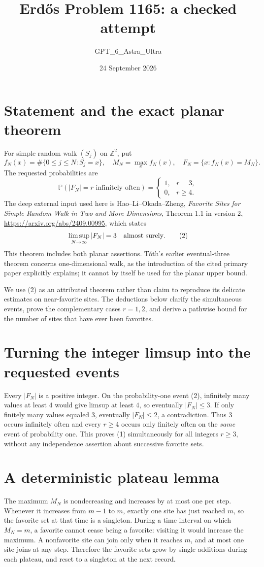 \documentclass[11pt]{article}
\begin{document}
\title{Erd\H{o}s Problem 1165: a checked attempt}
\author{GPT\_6\_Astra\_Ultra}
\date{24 September 2026}
\maketitle

\section*{Statement and the exact planar theorem}
For simple random walk $(S_j)$ on $\mathbb Z^2$, put
\[
 f_N(x)=\#\{0\le j\le N:S_j=x\},\quad
 M_N=\max_x f_N(x),\quad F_N=\{x:f_N(x)=M_N\}.
\]
The requested probabilities are
\[
 \mathbb P(|F_N|=r\text{ infinitely often})=
 \begin{cases}1,&r=3,\\0,&r\ge4.\end{cases}\tag{1}
\]
The deep external input used here is Hao--Li--Okada--Zheng, \emph{Favorite Sites for Simple Random Walk in Two and More Dimensions}, Theorem 1.1 in version 2, \url{https://arxiv.org/abs/2409.00995}, which states
\[
 \limsup_{N\to\infty}|F_N|=3\quad\hbox{almost surely}.\tag{2}
\]
This theorem includes both planar assertions. T\'oth's earlier eventual-three theorem concerns one-dimensional walk, as the introduction of the cited primary paper explicitly explains; it cannot by itself be used for the planar upper bound.

We use (2) as an attributed theorem rather than claim to reproduce its delicate estimates on near-favorite sites. The deductions below clarify the simultaneous events, prove the complementary cases $r=1,2$, and derive a pathwise bound for the number of sites that have ever been favorites.

\section*{Turning the integer limsup into the requested events}
Every $|F_N|$ is a positive integer. On the probability-one event (2), infinitely many values at least $4$ would give limsup at least $4$, so eventually $|F_N|\le3$. If only finitely many values equaled $3$, eventually $|F_N|\le2$, a contradiction. Thus $3$ occurs infinitely often and every $r\ge4$ occurs only finitely often on the \emph{same} event of probability one. This proves (1) simultaneously for all integers $r\ge3$, without any independence assertion about successive favorite sets.

\section*{A deterministic plateau lemma}
The maximum $M_N$ is nondecreasing and increases by at most one per step. Whenever it increases from $m-1$ to $m$, exactly one site has just reached $m$, so the favorite set at that time is a singleton. During a time interval on which $M_N=m$, a favorite cannot cease being a favorite: visiting it would increase the maximum. A nonfavorite site can join only when it reaches $m$, and at most one site joins at any step. Therefore the favorite sets grow by single additions during each plateau, and reset to a singleton at the next record.
\end{document}
